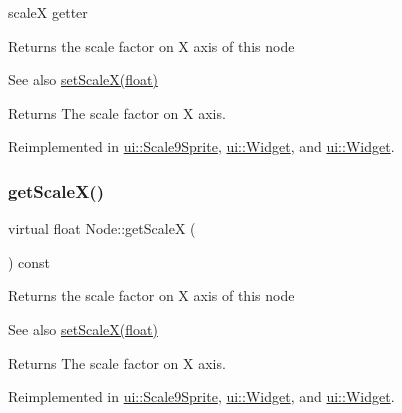 scaleX getter 

Returns the scale factor on X axis of this node

\begin{DoxySeeAlso}{See also}
\hyperlink{classNode_acf7f04074f7f49972e152788c090b877}{set\+Scale\+X(float)}
\end{DoxySeeAlso}
\begin{DoxyReturn}{Returns}
The scale factor on X axis. 
\end{DoxyReturn}


Reimplemented in \hyperlink{classui_1_1Scale9Sprite_a3aaed8de223156f4567a4b59e208e66d}{ui\+::\+Scale9\+Sprite}, \hyperlink{classui_1_1Widget_ad8e055be7f68c56594d97c71dff4f1ae}{ui\+::\+Widget}, and \hyperlink{classui_1_1Widget_aca37ca371fdab9dc91dc554740b37e11}{ui\+::\+Widget}.

\mbox{\label{classNode_a3ef411875aa6c675e72de13f91235694}} 
\subsubsection{\texorpdfstring{get\+Scale\+X()}{getScaleX()}\hspace{0.1cm}{\footnotesize\ttfamily [2/2]}}
{\footnotesize\ttfamily virtual float Node\+::get\+ScaleX (\begin{DoxyParamCaption}{ }\end{DoxyParamCaption}) const\hspace{0.3cm}{\ttfamily [virtual]}}

Returns the scale factor on X axis of this node

\begin{DoxySeeAlso}{See also}
\hyperlink{classNode_acf7f04074f7f49972e152788c090b877}{set\+Scale\+X(float)}
\end{DoxySeeAlso}
\begin{DoxyReturn}{Returns}
The scale factor on X axis. 
\end{DoxyReturn}


Reimplemented in \hyperlink{classui_1_1Scale9Sprite_a3aaed8de223156f4567a4b59e208e66d}{ui\+::\+Scale9\+Sprite}, \hyperlink{classui_1_1Widget_ad8e055be7f68c56594d97c71dff4f1ae}{ui\+::\+Widget}, and \hyperlink{classui_1_1Widget_aca37ca371fdab9dc91dc554740b37e11}{ui\+::\+Widget}.

\mbox{\label{classNode_ab87661ab8940512baf2e7639ea55ff87}} 
